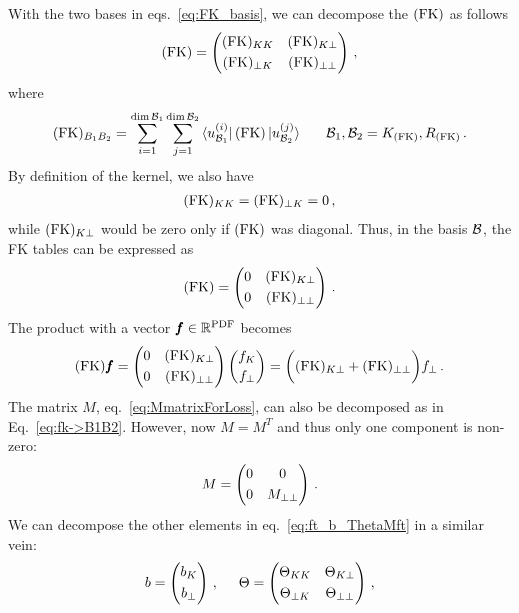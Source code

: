 With the two bases in eqs.~\eqref{eq:FK_basis}, we can decompose the $(\mathrm{FK})$ as follows
\begin{equation}
  (\mathrm{FK}) =
  \begin{pmatrix}
    (\mathrm{FK})_{KK}     & (\mathrm{FK})_{K\bot} \\[3pt]
    (\mathrm{FK})_{\bot K} & (\mathrm{FK})_{\bot\bot}
  \end{pmatrix} \,,
\end{equation}
where
\begin{align}
  (\mathrm{FK})_{B_1 B_2} = \sum_{i=1}^{\dim\mathcal{B}_1} \sum_{j=1}^{\dim\mathcal{B}_2}
  \bra{u_{\mathcal{B}_1}^{(i)}} (\mathrm{FK}) \ket{u_{\mathcal{B}_2}^{(j)}} \;
  \hspace{5mm}
  \mathcal{B}_1, \mathcal{B}_2 = K_{(\mathrm{FK})}, R_{(\mathrm{FK})}\,.
  \label{eq:fk->B1B2}
\end{align}
By definition of the kernel, we also have
\begin{align}
  (\mathrm{FK})_{KK} = (\mathrm{FK})_{\bot K} = 0 \,,
\end{align}
while $(\mathrm{FK})_{K\bot}$ would be zero only if $(\mathrm{FK})$ was diagonal. Thus, in the basis
$\mathcal{B}$, the FK tables can be expressed as
\begin{align}
  (\mathrm{FK}) =
  \begin{pmatrix}
    0  & (\mathrm{FK})_{K\bot} \\[3pt]
    0 & (\mathrm{FK})_{\bot\bot}
  \end{pmatrix} \,.
\end{align}
The product with a vector $\pmb{f} \in \mathbb{R}^{\textrm{PDF}}$ becomes
\begin{equation}
  (\mathrm{FK}) \pmb{f} =
    \begin{pmatrix}
      0  & (\mathrm{FK})_{K\bot} \\[3pt]
      0  & (\mathrm{FK})_{\bot\bot}
    \end{pmatrix}
    \begin{pmatrix} 
      f_K \\[2pt]
      f_{\bot}
    \end{pmatrix}
    = \biggl((\mathrm{FK})_{K\bot} + (\mathrm{FK})_{\bot\bot}\biggr) f_{\bot} \,.
\end{equation}
The matrix $M$, eq.~\eqref{eq:MmatrixForLoss}, can also be decomposed as in Eq.~\eqref{eq:fk->B1B2}. However, now
$M=M^T$ and thus only one component is non-zero:
\begin{align}
  M =
  \begin{pmatrix}
    0 & 0 \\[3pt]
    0 & M_{\bot\bot}
  \end{pmatrix} \,.
  \label{eq:fk_projection_basis}
\end{align}
We can decompose the other elements in eq.~\eqref{eq:ft_b_ThetaMft} in a similar vein:
\begin{align}
  b = \begin{pmatrix} b_{K} \\[3pt] b_{\bot} \end{pmatrix} \,,
  \hspace{5mm}
  \Theta = \begin{pmatrix}
    \Theta_{KK} & \Theta_{K\bot} \\[3pt]
    \Theta_{\bot K} & \Theta_{\bot\bot}
  \end{pmatrix} \,,
\end{align}
